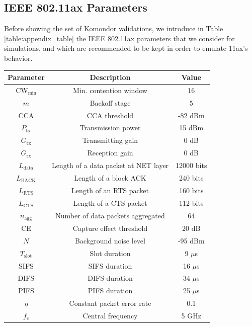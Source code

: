\documentclass[a4paper]{article}
\begin{document}
	\subsection{IEEE 802.11ax Parameters}
	\label{section:parameters}
	Before showing the set of Komondor validations, we introduce in Table \ref{table:appendix_table} the IEEE 802.11ax parameters that we consider for simulations, and which are recommended to be kept in order to emulate 11ax's behavior.	
	\begin{table}[h]
		\centering
			\begin{tabular}{|c|c|c|}
			\hline
			\textbf{Parameter}     & \textbf{Description}              & \textbf{Value} \\ \hline
			$\text{CW}_\text{min}$ & Min. contention window            & 16             \\ \hline
			$m$                    & Backoff stage                     & 5              \\ \hline
			CCA                    & CCA threshold                               & -82 dBm        \\ \hline
			$P_\text{tx}$          & Transmission power                & 15 dBm         \\ \hline
			$G_\text{tx}$         & Transmitting gain                 & 0 dB           \\ \hline
			$G_\text{rx}$         & Reception gain                    & 0 dB           \\ \hline
			$L_\text{data}$       & Length of a data packet at NET layer           & 12000 bits     \\ \hline
			$L_\text{BACK}$       & Length of a block ACK             & 240 bits       \\ \hline
			$L_\text{RTS}$        & Length of an RTS packet           & 160 bits       \\ \hline
			$L_\text{CTS}$        & Length of a CTS packet            & 112 bits       \\ \hline
			$n_\text{agg}$       & Number of data packets aggregated & 64             \\ \hline
			CE                     & Capture effect threshold          & 20 dB          \\ \hline
			$N$                      & Background noise level            & -95 dBm        \\ \hline
			$T_\text{slot}$       & Slot duration                     & 9 $\mu$s          \\ \hline
			SIFS                   & SIFS duration                     & 16 $\mu$s          \\ \hline
			DIFS                   & DIFS duration                     & 34 $\mu$s          \\ \hline
			PIFS                   & PIFS duration                     & 25 $\mu$s         \\ \hline
			$\eta$                 & Constant packet error rate        & 0.1           \\ \hline
			$f_c$                 & Central frequency       & 5 GHz           \\ \hline
			

\end{tabular}
\end{table}
\end{document}
